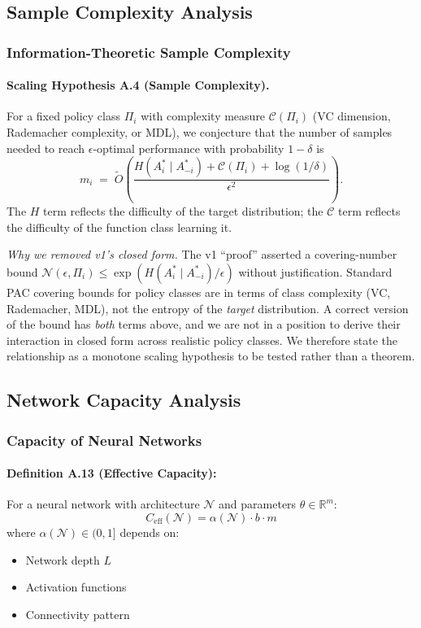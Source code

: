 \documentclass[10pt, letterpaper]{article}
\begin{document}
\subsection{Sample Complexity Analysis}

\subsubsection{Information-Theoretic Sample Complexity}

\paragraph{Scaling Hypothesis A.4 (Sample Complexity).} For a fixed policy class $\Pi_i$ with complexity measure $\mathcal{C}(\Pi_i)$ (VC dimension, Rademacher complexity, or MDL), we conjecture that the number of samples needed to reach $\epsilon$-optimal performance with probability $1-\delta$ is
\[m_i \;=\; \tilde{O}\!\left(\frac{H(A_i^*\mid A_{-i}^*) + \mathcal{C}(\Pi_i) + \log(1/\delta)}{\epsilon^2}\right).\]
The $H$ term reflects the difficulty of the target distribution; the $\mathcal{C}$ term reflects the difficulty of the function class learning it.

\emph{Why we removed v1's closed form.} The v1 ``proof'' asserted a covering-number bound $\mathcal{N}(\epsilon, \Pi_i) \leq \exp(H(A_i^*\mid A_{-i}^*)/\epsilon)$ without justification. Standard PAC covering bounds for policy classes are in terms of class complexity (VC, Rademacher, MDL), not the entropy of the \emph{target} distribution. A correct version of the bound has \emph{both} terms above, and we are not in a position to derive their interaction in closed form across realistic policy classes. We therefore state the relationship as a monotone scaling hypothesis to be tested rather than a theorem.

\subsection{Network Capacity Analysis}

\subsubsection{Capacity of Neural Networks}

\paragraph{Definition A.13 (Effective Capacity):} For a neural network with architecture $\mathcal{N}$ and parameters $\theta \in \mathbb{R}^m$:
\[C_{\text{eff}}(\mathcal{N}) = \alpha(\mathcal{N}) \cdot b \cdot m\]
where $\alpha(\mathcal{N}) \in (0,1]$ depends on:
\begin{itemize}
    \item Network depth $L$
    \item Activation functions
    \item Connectivity pattern
\end{itemize}
\end{document}
